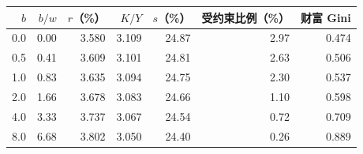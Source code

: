 \begin{tabular}{rrrrrrr}
\toprule
$b$ & $b/w$ & $r$（\%） & $K/Y$ & $s$（\%） & 受约束比例（\%） & 财富 Gini \\
\midrule
0.0 & 0.00 & 3.580 & 3.109 & 24.87 & 2.97 & 0.474 \\
0.5 & 0.41 & 3.609 & 3.101 & 24.81 & 2.63 & 0.506 \\
1.0 & 0.83 & 3.635 & 3.094 & 24.75 & 2.30 & 0.537 \\
2.0 & 1.66 & 3.678 & 3.083 & 24.66 & 1.10 & 0.598 \\
4.0 & 3.33 & 3.737 & 3.067 & 24.54 & 0.72 & 0.709 \\
8.0 & 6.68 & 3.802 & 3.050 & 24.40 & 0.26 & 0.889 \\
\bottomrule
\end{tabular}
